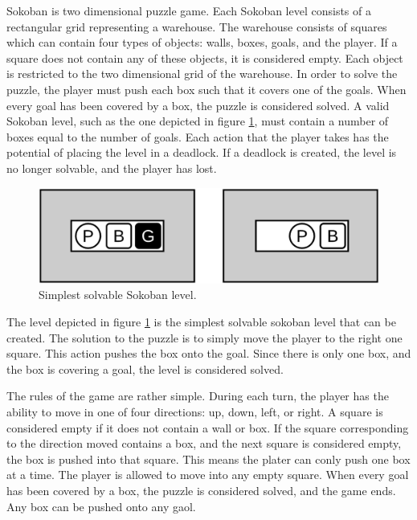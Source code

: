 \documentclass[times, 10pt,twocolumn]{article}
\begin{document}
Sokoban is two dimensional puzzle game. Each Sokoban level consists of a rectangular grid representing a warehouse. The warehouse consists of squares which can contain four types of objects: walls, boxes, goals, and the player. If a square does not contain any of these objects, it is considered empty. Each object is restricted to the two dimensional grid of the warehouse. In order to solve the puzzle, the player must push each box such that it covers one of the goals. When every goal has been covered by a box, the puzzle is considered solved. A valid Sokoban level, such as the one depicted in figure \ref{fig:b}, must contain a number of boxes equal to the number of goals. Each action that the player takes has the potential of placing the level in a deadlock. If a deadlock is created, the level is no longer solvable, and the player has lost.

\begin{figure}[h] 
  \centering
     \includegraphics[width=0.7\linewidth]{images/basic_unsolved_solved.png}
  \caption{Simplest solvable Sokoban level.}
  \label{fig:b}
\end{figure}

The level depicted in figure \ref{fig:b} is the simplest solvable sokoban level that can be created. The solution to the puzzle is to simply move the player to the right one square. This action pushes the box onto the goal. Since there is only one box, and the box is covering a goal, the level is considered solved.


The rules of the game are rather simple. During each turn, the player has the ability to move in one of four directions: up, down, left, or right. A square is considered empty if it does not contain a wall or box. If the square corresponding to the direction moved contains a box, and the next square is considered empty, the box is pushed into that square. This means the plater can conly push one box at a time. The player is allowed to move into any empty square. When every goal has been covered by a box, the puzzle is considered solved, and the game ends. Any box can be pushed onto any gaol. 
\end{document}
